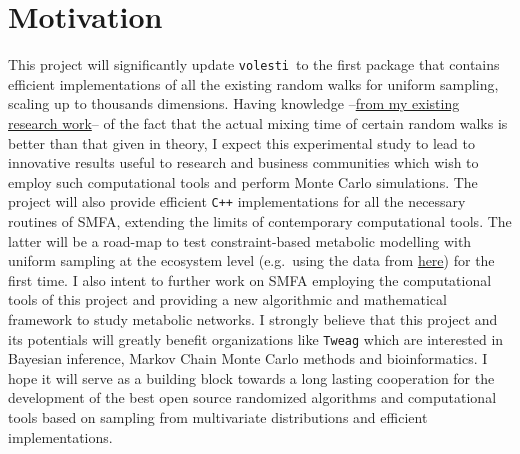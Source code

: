 \documentclass[a4paper, 12pt]{article}
\def\volesti{{\tt volesti}}
\begin{document}
\section{Motivation}\label{sec:motivation}
This project will significantly update \volesti\ to the first package that contains efficient implementations of all the existing random walks for uniform sampling, scaling up to thousands dimensions. Having knowledge --\textcolor{blue}{\href{https://www.slideshare.net/ApostolosChalkis/14th-athens-colloquium-on-algorithms-and-complexity-acac19}{from my existing research work}}-- of the fact that the actual mixing time of certain random walks is better than that given in theory, I expect this experimental study to lead to innovative results useful to research and business communities which wish to employ such computational tools and perform Monte Carlo simulations. The project will also provide  efficient {\tt C++} implementations for all the necessary routines of SMFA, extending the limits of contemporary computational tools. The latter will be a road-map to test constraint-based metabolic modelling with uniform sampling at the ecosystem level (e.g.\ using the data from \textcolor{blue}{\href{https://www.biorxiv.org/content/10.1101/857391v1}{here}}) for the first time. I also intent to further work on SMFA employing the computational tools of this project and providing a new algorithmic and mathematical framework to study metabolic networks. I strongly believe that this project and its potentials will greatly benefit organizations like {\tt Tweag} which are interested in Bayesian inference, Markov Chain Monte Carlo methods and bioinformatics. I hope it will serve as a building block towards a long lasting cooperation for the development of the best open source randomized algorithms and computational tools based on sampling from multivariate distributions and efficient implementations.

\end{document}
